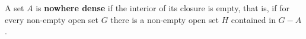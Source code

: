 A set $A$ is \textbf{nowhere dense} if the interior of its closure is empty, that is, if for every non-empty open set $G$ there is a non-empty open set $H$ contained in $G - A$.
